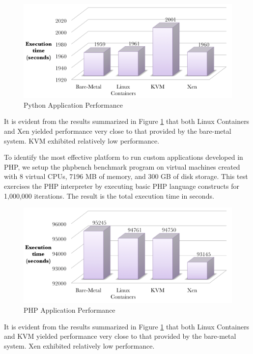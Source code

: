 \begin{figure}[H]
\centering
\includegraphics[width=150mm]{pybench.png}
\caption{Python Application Performance}
\label{fig:pybench}
\end{figure}

It is evident from the results summarized in Figure \ref{fig:pybench} that both Linux Containers and Xen yielded performance very close to that provided by the bare-metal system. KVM exhibited relatively low performance. 

To identify the most effective platform to run custom applications developed in PHP, we setup the phpbench benchmark program on virtual machines created with 8 virtual CPUs, 7196 MB of memory, and 300 GB of disk storage. This test exercises the PHP interpreter by executing basic PHP language constructs for 1,000,000 iterations. The result is the total execution time in seconds.

\begin{figure}[H]
\centering
\includegraphics[width=150mm]{phpbench.png}
\caption{PHP Application Performance}
\label{fig:phpbench}
\end{figure}

It is evident from the results summarized in Figure \ref{fig:pybench} that both Linux Containers and KVM yielded performance very close to that provided by the bare-metal system. Xen exhibited relatively low performance. 


